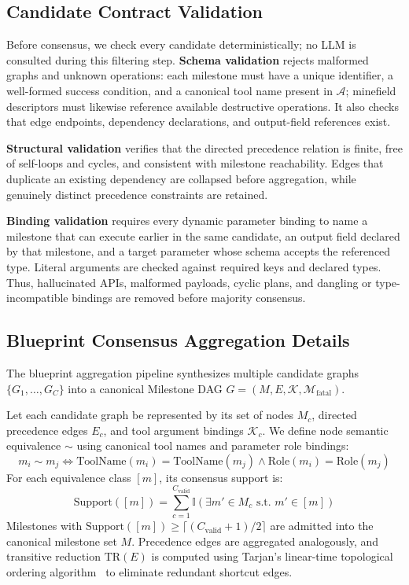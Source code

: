 \subsection{Candidate Contract Validation}
\label{app:contract_validation}

Before consensus, we check every candidate deterministically; no LLM is consulted during this filtering step. \textbf{Schema validation} rejects malformed graphs and unknown operations: each milestone must have a unique identifier, a well-formed success condition, and a canonical tool name present in $\mathcal{A}$; minefield descriptors must likewise reference available destructive operations. It also checks that edge endpoints, dependency declarations, and output-field references exist.

\textbf{Structural validation} verifies that the directed precedence relation is finite, free of self-loops and cycles, and consistent with milestone reachability. Edges that duplicate an existing dependency are collapsed before aggregation, while genuinely distinct precedence constraints are retained.

\textbf{Binding validation} requires every dynamic parameter binding to name a milestone that can execute earlier in the same candidate, an output field declared by that milestone, and a target parameter whose schema accepts the referenced type. Literal arguments are checked against required keys and declared types. Thus, hallucinated APIs, malformed payloads, cyclic plans, and dangling or type-incompatible bindings are removed before majority consensus.

\subsection{Blueprint Consensus Aggregation Details}
The blueprint aggregation pipeline synthesizes multiple candidate graphs $\{G_1, \dots, G_C\}$ into a canonical Milestone DAG $G = (M, E, \mathcal{K}, \mathcal{M}_{\text{fatal}})$. 

Let each candidate graph be represented by its set of nodes $M_c$, directed precedence edges $E_c$, and tool argument bindings $\mathcal{K}_c$. We define node semantic equivalence $\sim$ using canonical tool names and parameter role bindings:
\begin{equation}
    m_i \sim m_j \iff \text{ToolName}(m_i) = \text{ToolName}(m_j) \land \text{Role}(m_i) = \text{Role}(m_j)
\end{equation}
For each equivalence class $[m]$, its consensus support is:
\begin{equation}
    \text{Support}([m]) = \sum_{c=1}^{C_{\text{valid}}} \mathbb{I}\left( \exists m' \in M_c \text{ s.t. } m' \in [m] \right)
\end{equation}
Milestones with $\text{Support}([m]) \ge \lceil (C_{\text{valid}} + 1) / 2 \rceil$ are admitted into the canonical milestone set $M$. Precedence edges are aggregated analogously, and transitive reduction $\text{TR}(E)$ is computed using Tarjan's linear-time topological ordering algorithm~\citep{tarjan1972depth} to eliminate redundant shortcut edges.


